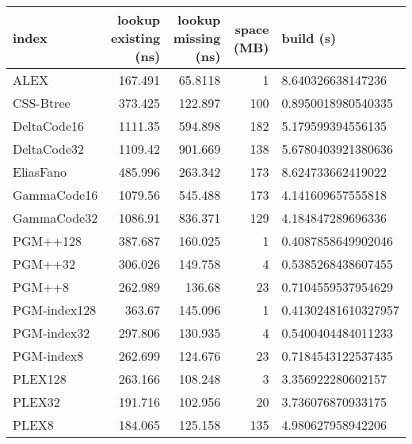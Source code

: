 \begin{tabular}{lrrrl}
\hline
 index             &   lookup existing (ns) &   lookup missing (ns) &   space (MB) & build (s)            \\
\hline
 ALEX              &                167.491 &               65.8118 &            1 & 8.640326638147236    \\
 CSS-Btree         &                373.425 &              122.897  &          100 & 0.8950018980540335   \\
 DeltaCode16       &               1111.35  &              594.898  &          182 & 5.179599394556135    \\
 DeltaCode32       &               1109.42  &              901.669  &          138 & 5.6780403921380636   \\
 EliasFano         &                485.996 &              263.342  &          173 & 8.624733662419022    \\
 GammaCode16       &               1079.56  &              545.488  &          173 & 4.141609657555818    \\
 GammaCode32       &               1086.91  &              836.371  &          129 & 4.184847289696336    \\
 PGM++128          &                387.687 &              160.025  &            1 & 0.4087858649902046   \\
 PGM++32           &                306.026 &              149.758  &            4 & 0.5385268438607455   \\
 PGM++8            &                262.989 &              136.68   &           23 & 0.7104559537954629   \\
 PGM-index128      &                363.67  &              145.096  &            1 & 0.41302481610327957  \\
 PGM-index32       &                297.806 &              130.935  &            4 & 0.5400404484011233   \\
 PGM-index8        &                262.699 &              124.676  &           23 & 0.7184543122537435   \\
 PLEX128           &                263.166 &              108.248  &            3 & 3.356922280602157    \\
 PLEX32            &                191.716 &              102.956  &           20 & 3.736076870933175    \\
 PLEX8             &                184.065 &              125.158  &          135 & 4.980627958942206    \\

\end{tabular}
